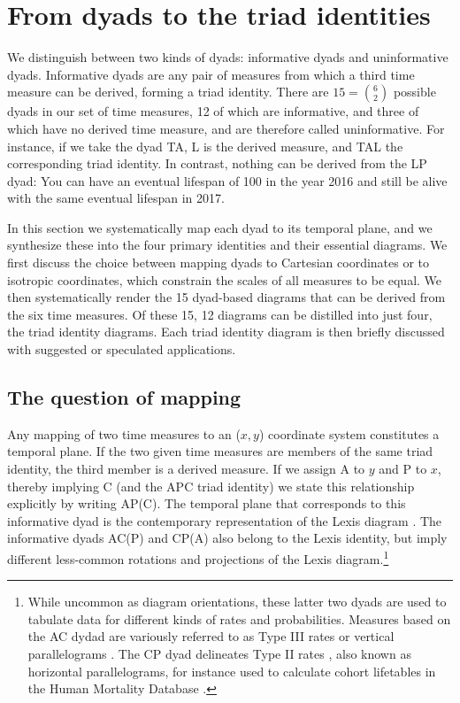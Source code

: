 \documentclass[12pt,oneside,a4paper]{article} %
\begin{document}

\section{From dyads to the triad identities}
We distinguish between two kinds of dyads: informative dyads and uninformative dyads. Informative dyads are any pair of measures from which a third time measure
can be derived, forming a triad identity. There are
$15=\binom{6}{2}$ possible dyads in our set of time measures, 12 of which are
informative, and three of which have no derived time measure, and are therefore
called uninformative. For instance, if we take the dyad TA, L is the derived
measure, and TAL the corresponding triad identity. In
contrast, nothing can be derived from the LP dyad: You can have an eventual lifespan of 100 in the year 2016 and still be alive with the same eventual lifespan in 2017.

In this section we systematically map each dyad to its temporal plane, and we
synthesize these into the four primary identities and their essential diagrams.
We first discuss the choice between mapping dyads to Cartesian coordinates or to
isotropic coordinates, which constrain the scales of all measures to be equal.
We then systematically render the 15 dyad-based diagrams that can be derived from the six time measures. Of these 15, 12 diagrams can be distilled into just four, the triad identity diagrams. Each
triad identity diagram is then briefly discussed with suggested or speculated
applications.

\subsection{The question of mapping}
Any mapping of two time measures to an ($x,y$) coordinate
system constitutes a temporal plane. If the two given time measures are members of the same triad identity, the third member is a derived
measure. If we assign A to $y$ and P to $x$, thereby implying C (and the APC
triad identity) we state this relationship explicitly by writing
AP(C).
The temporal plane that corresponds to this informative dyad is the contemporary representation of the
Lexis diagram \citep{lexis1875einleitung, pressat1961analyse}. The informative
dyads AC(P) and CP(A) also belong to the Lexis identity, but imply different
less-common rotations and projections of the Lexis diagram.\footnote{While
uncommon as diagram orientations, these latter two dyads are used to tabulate
data for different kinds of rates and probabilities. Measures
based on the AC dydad are variously referred to as Type III rates
\citep{caselli2005demography} or vertical parallelograms \citep{HMDMP}. The CP
dyad delineates Type II rates \citep{caselli2005demography}, also known as
horizontal parallelograms, for instance used to calculate cohort lifetables in the Human
Mortality Database \citep{HMDMP}. }
\end{document}

